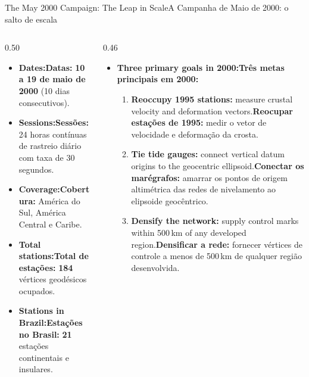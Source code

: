 \documentclass[aspectratio=169,11pt]{beamer}
\newcommand{\tr}[2]{\ifEN#2\else#1\fi}
\newcommand{\bnum}[1]{\ifmmode\textcolor{mTeal}{\mathbf{#1}}\else\textbf{\textcolor{mTeal}{#1}}\fi}
\begin{document}
\begin{frame}{\tr{A Campanha de Maio de 2000: o salto de escala}{The May 2000 Campaign: The Leap in Scale}}
  \begin{columns}[onlytextwidth]
    \begin{column}{0.50\textwidth}
      \begin{tcolorbox}[colback=mTeal!8, colframe=mTeal, title={\tr{A Operação Continental}{The Continental Operation}}]
        \scriptsize
        \begin{itemize}
          \setlength{\itemsep}{3pt}
          \item \textbf{\tr{Datas:}{Dates:}} \bnum{10 a 19 de maio de 2000} (\num{10} dias consecutivos).
          \item \textbf{\tr{Sessões:}{Sessions:}} \num{24} horas contínuas de rastreio diário com taxa de \num{30} segundos.
          \item \textbf{\tr{Cobertura:}{Coverage:}} América do Sul, América Central e Caribe.
          \item \textbf{\tr{Total de estações:}{Total stations:}} \bnum{\num{184}} vértices geodésicos ocupados.
          \item \textbf{\tr{Estações no Brasil:}{Stations in Brazil:}} \bnum{\num{21}} estações continentais e insulares.
        \end{itemize}
      \end{tcolorbox}
    \end{column}
    \begin{column}{0.46\textwidth}
      \begin{itemize}
        \setlength{\itemsep}{4pt}
        \scriptsize
        \item \tr{\textbf{Três metas principais em 2000:}}{\textbf{Three primary goals in 2000:}}
              \begin{enumerate}
                \tiny
                \item \tr{\textbf{Reocupar estações de 1995:} medir o vetor de velocidade e deformação da crosta.}{\textbf{Reoccupy 1995 stations:} measure crustal velocity and deformation vectors.}
                \item \tr{\textbf{Conectar os marégrafos:} amarrar os pontos de origem altimétrica das redes de nivelamento ao elipsoide geocêntrico.}{\textbf{Tie tide gauges:} connect vertical datum origins to the geocentric ellipsoid.}
                \item \tr{\textbf{Densificar a rede:} fornecer vértices de controle a menos de \num{500}\,km de qualquer região desenvolvida.}{\textbf{Densify the network:} supply control marks within \num{500}\,km of any developed region.}
              \end{enumerate}
      \end{itemize}
    \end{column}
  \end{columns}
\end{frame}
\end{document}
